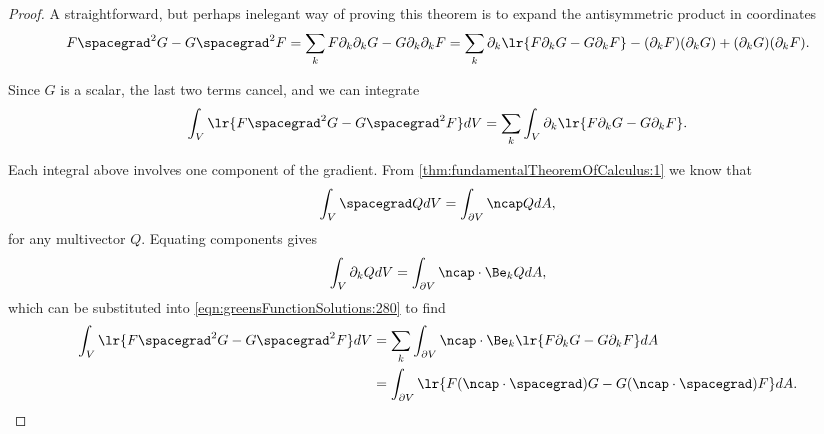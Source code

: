 \begin{proof}
A straightforward, but perhaps inelegant way of proving this theorem is to expand the antisymmetric product in coordinates
\begin{dmath}\label{eqn:greensFunctionSolutions:260}
F \spacegrad^2 G - G \spacegrad^2 F
=
\sum_k F \partial_k \partial_k G - G \partial_k \partial_k F
=
\sum_k \partial_k \lr{
F \partial_k G - G \partial_k F
}
-
(\partial_k F)(\partial_k G) + (\partial_k G)(\partial_k F).
\end{dmath}

Since \( G \) is a scalar, the last two terms cancel, and we can integrate
\begin{equation}\label{eqn:greensFunctionSolutions:280}
\int_V \lr{ F \spacegrad^2 G - G \spacegrad^2 F } dV
=
\sum_k \int_V \partial_k \lr{ F \partial_k G - G \partial_k F }.
\end{equation}

Each integral above involves one component of the gradient.
From
\cref{thm:fundamentalTheoremOfCalculus:1}
we know that
\begin{equation}\label{eqn:greensFunctionSolutions:300}
\int_V \spacegrad Q dV = \int_{\partial V} \ncap Q dA,
\end{equation}
for any multivector \( Q \).
Equating components gives
\begin{equation}\label{eqn:greensFunctionSolutions:460}
\int_V \partial_k Q dV = \int_{\partial V} \ncap \cdot \Be_k Q dA,
\end{equation}
which can be substituted into \cref{eqn:greensFunctionSolutions:280} to find
\begin{equation}\label{eqn:greensFunctionSolutions:480}
\begin{aligned}
\int_V \lr{ F \spacegrad^2 G - G \spacegrad^2 F } dV
&= \sum_k \int_{\partial V} \ncap \cdot \Be_k \lr{ F \partial_k G - G \partial_k F } dA \\
&= \int_{\partial V} \lr{ F (\ncap \cdot \spacegrad) G - G (\ncap \cdot \spacegrad) F } dA.
\end{aligned}
\end{equation}
\end{proof}

